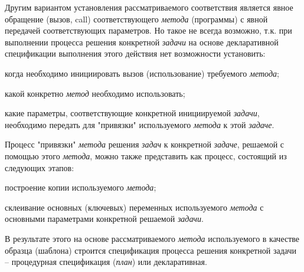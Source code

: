 \begin{SCn}
{Другим вариантом установления рассматриваемого соответствия является явное обращение (вызов, call) соответствующего \textit{метода} (программы) с явной передачей соответствующих параметров. Но такое не всегда возможно, т.к. при выполнении процесса решения конкретной \textit{задачи} на основе декларативной спецификации выполнения этого действия нет возможности установить:
	\begin{scnitemize}
	\item когда необходимо инициировать вызов (использование) требуемого \textit{метода};
	\item какой конкретно \textit{метод} необходимо использовать;
	\item какие параметры, соответствующие конкретной инициируемой \textit{задачи}, необходимо передать для "привязки"{} используемого \textit{метода} к этой \textit{задаче}.
	\end{scnitemize}
	

Процесс "привязки"{} \textit{метода} решения \textit{задач} к конкретной \textit{задаче}, решаемой с помощью этого \textit{метода}, можно также представить как процесс, состоящий из следующих этапов:
	\begin{scnitemize}
	\item построение копии используемого \textit{метода};
	\item склеивание основных (ключевых) переменных используемого \textit{метода} с основными параметрами конкретной решаемой \textit{задачи}.
	\end{scnitemize}

В результате этого на основе рассматриваемого \textit{метода} используемого в качестве образца (шаблона) строится спецификация процесса решения конкретной задачи -- процедурная спецификация (\textit{план}) или декларативная.}



\end{SCn}
